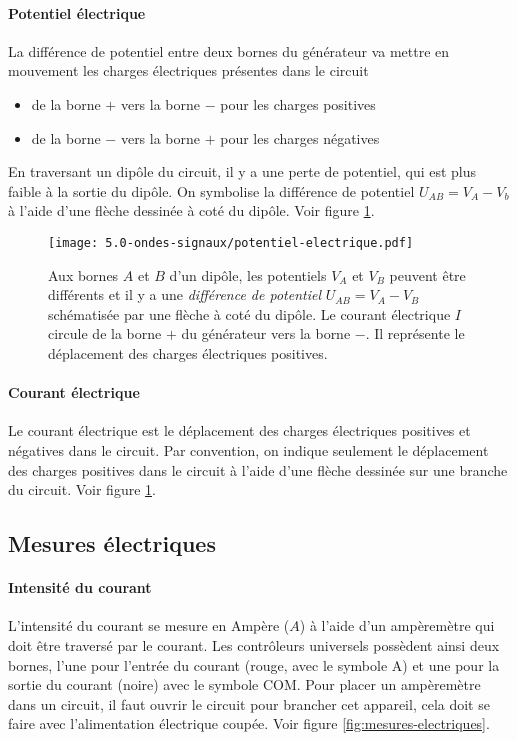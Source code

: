 \paragraph{Potentiel électrique}
La différence de potentiel entre deux bornes du générateur va mettre en mouvement les charges électriques présentes dans le circuit 
\begin{itemize}
 \item de la borne $+$ vers la borne $-$ pour les charges positives
 \item de la borne $-$ vers la borne $+$ pour les charges négatives
\end{itemize}
En traversant un dipôle du circuit, il y a une perte de potentiel, qui est plus faible à la sortie du dipôle.
On symbolise la différence de potentiel $U_{AB}=V_A-V_b$ à l'aide d'une flèche dessinée à coté du dipôle. Voir figure \ref{fig:potentiel-electrique}.
\begin{figure}[h!]
  \begin{center}
      \texttt{[image: 5.0-ondes-signaux/potentiel-electrique.pdf]}
  \end{center}
  \caption{Aux bornes $A$ et $B$ d'un dipôle, les potentiels $V_A$ et $V_B$ peuvent être différents et il y a une \textit{différence de potentiel} $U_{AB} = V_A - V_B$ schématisée par une flèche à coté du dipôle. Le courant électrique $I$ circule de la borne $+$ du générateur vers la borne $-$. Il représente le déplacement des charges électriques positives.}
  \label{fig:potentiel-electrique}
\end{figure}

\paragraph{Courant électrique} Le courant électrique est le déplacement des charges électriques positives et négatives dans le circuit. Par convention, on indique seulement le déplacement des charges positives dans le circuit à l'aide d'une flèche dessinée sur une branche du circuit. Voir figure \ref{fig:potentiel-electrique}.
\subsection{Mesures électriques}
\paragraph{Intensité du courant} L'intensité du courant se mesure en Ampère ($A$) à l'aide d'un ampèremètre qui doit être traversé par le courant. Les contrôleurs universels possèdent ainsi deux bornes, l'une pour l'entrée du courant (rouge, avec le symbole A) et une pour la sortie du courant (noire) avec le symbole COM. Pour placer un ampèremètre dans un circuit, il faut ouvrir le circuit pour brancher cet appareil, cela doit se faire avec l'alimentation électrique coupée. Voir figure \ref{fig:mesures-electriques}.
